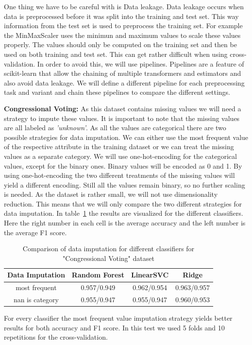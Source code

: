 \documentclass[a4paper,10pt]{article}
\begin{document}
One thing we have to be careful with is Data leakage. Data leakage occurs when data is preprocessed before it was split into the training and test set. This way information 
from the test set is used to preprocess the training set. For example the MinMaxScaler uses the minimun and maximum values 
to scale these values properly. The values should only be computed on the training set and then be used on both training and 
test set. This can get rather difficult when using cross-validation. In order to avoid this, we will use pipelines.    
Pipelines are a feature of scikit-learn that allow the chaining of multiple transformers and estimators and also avoid 
data leakage. We will define a different pipeline for each preprocessing task and variant and chain these pipelines to compare 
the different settings.

\textbf{Congressional Voting:} As this dataset contains missing values we will need a strategy to impute these values. 
It is important to note that the missing values are all labeled as \textit{'unknown'}.
As all the values are categorical there are two possible strategies for data imputation.
We can either use the most frequent value of the respective attribute in the training dataset
or we can treat the missing values as a separate category. We will use one-hot-encoding for the categorical values,
except for the binary ones. Binary values will be encoded as 0 and 1. By using one-hot-encoding
the two different treatments of the missing values will yield a different encoding. Still all the values remain binary, 
so no further scaling is needed. As the dataset is rather small, we will not use dimensionality reduction. This means
that we will only compare the two different strategies for data imputation.
In table~\ref{table:imputation} the results are visualized for the different classifiers.
Here the right number in each cell is the average accuracy and the left number is the average F1 score.

\begin{table}[h!]
\centering
\begin{tabular}{|c|c|c|c|}
\hline
\textbf{Data Imputation} & \textbf{Random Forest} & \textbf{LinearSVC} & \textbf{Ridge} \\
\hline
\textsf{most frequent} & \cellcolor[HTML]{C1E1C1}0.957/0.949 & \cellcolor[HTML]{C1E1C1}0.962/0.954 & \cellcolor[HTML]{C1E1C1}0.963/0.957 \\
\hline
\textsf{nan is category} & 0.955/0.947 & 0.955/0.947 & 0.960/0.953 \\
\hline
\end{tabular}
\caption{Comparison of data imputation for different classifiers for "Congressional Voting" dataset}
\label{table:imputation}
\end{table}
For every classifier the most frequent value imputation strategy yields better results for both accuracy and F1 score.
In this test we used 5 folds and 10 repetitions for the cross-validation.
\end{document}
